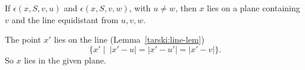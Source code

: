 \begin{tarskidata}
\begin{tarski}

\begin{lemma}
If $\epsilon(x,S,v,u)$ and $\epsilon(x,S,v,w)$,
with $u\ne w$, then
   $x$ lies on a plane containing $v$ and the line equidistant
from $u,v,w$.  
\end{lemma}

\begin{proved}  The point $x'$ lies on the line (Lemma~\ref{tarski:line-lem})
   $$\{x' \mid \ |x'-u|=|x'-u'|=|x'-v|\}.$$
So $x$ lies in the given plane.
\swallowed\end{proved}
\end{tarski}







\end{tarskidata}
